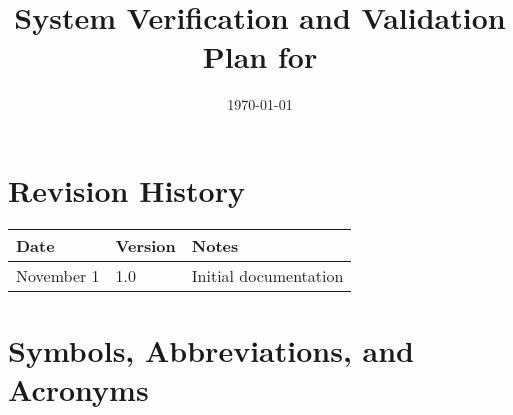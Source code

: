 \documentclass[12pt, titlepage]{article}
\begin{document}
\title{System Verification and Validation Plan for \progname{}} 
\author{\authname}
\date{\today}
	
\maketitle


\section*{Revision History}

\begin{tabularx}{\textwidth}{p{3cm}p{2cm}X}
\toprule {\bf Date} & {\bf Version} & {\bf Notes}\\
\midrule
November 1 & 1.0 & Initial documentation\\
\bottomrule
\end{tabularx}



\newpage

\tableofcontents

\listoftables


\newpage

\section{Symbols, Abbreviations, and Acronyms}
\end{document}
